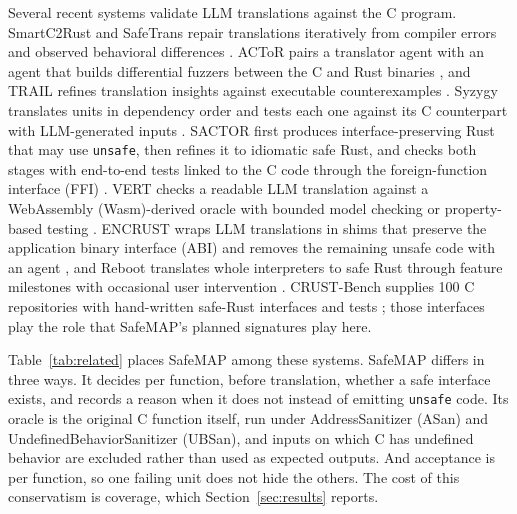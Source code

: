 \documentclass[pdflatex,sn-basic]{sn-jnl}
\newcommand{\tool}{SafeMAP\xspace}
\begin{document}
Several recent systems validate LLM translations against the C program.
SmartC2Rust and SafeTrans repair translations iteratively from compiler errors
and observed behavioral differences \citep{shiraishi2026smartc2rust,
farrukh2026safetrans}. ACToR pairs a translator agent with an agent that
builds differential fuzzers between the C and Rust binaries
\citep{li2025actor}, and TRAIL refines translation insights against executable
counterexamples \citep{wang2026trail}.
Syzygy translates units in dependency order and tests each one against its C
counterpart with LLM-generated inputs \citep{shetty2024syzygy}. SACTOR first
produces interface-preserving Rust that may use \texttt{unsafe}, then refines
it to idiomatic safe Rust, and checks both stages with end-to-end tests linked
to the C code through the foreign-function interface (FFI) \citep{zhou2025sactor}.
VERT checks a readable LLM translation against a WebAssembly (Wasm)-derived oracle
with bounded model checking or property-based testing \citep{yang2025vert}.
ENCRUST wraps LLM translations in shims that preserve the application binary interface (ABI) and removes the
remaining unsafe code with an agent \citep{sim2026encrust}, and Reboot
translates whole interpreters to safe Rust through feature milestones with
occasional user intervention \citep{wang2026reboot}. CRUST-Bench supplies 100
C repositories with hand-written safe-Rust interfaces and tests
\citep{khatry2025crustbench}; those interfaces play the role that \tool's
planned signatures play here.

Table~\ref{tab:related} places \tool among these systems. \tool differs in
three ways. It decides per function, before translation, whether a safe
interface exists, and records a reason when it does not instead of emitting
\texttt{unsafe} code. Its oracle is the original C function itself, run under
AddressSanitizer (ASan) and UndefinedBehaviorSanitizer (UBSan), and inputs on which C has undefined behavior are excluded
rather than used as expected outputs. And acceptance is per function, so one
failing unit does not hide the others. The cost of this conservatism is
coverage, which Section~\ref{sec:results} reports.
\end{document}
